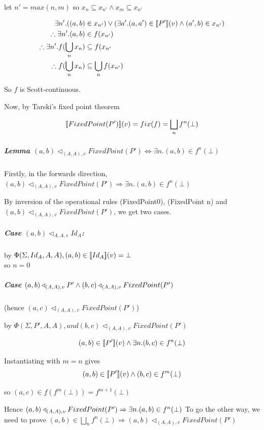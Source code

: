 \documentclass[12pt,a4paper,twoside,openright]{report}
\newcommand{\db}[1]{{\bf [\![}#1{\bf ]\!]}}
\newcommand{\deno}[1]{\db{#1}(v)}
\newcommand{\denoRule}[2]{#1 \in \deno{#2}}
\newcommand{\opRule}[3]{#1 \triangleleft_{#2, v} #3}
\newcommand{\phiRule}[3]{\Phi(\Sigma, #1, #2, #3)}
\let\oldsubparagraph\subparagraph
\renewcommand{\subparagraph}[1]{\oldsubparagraph{#1}\mbox{}}
\begin{document}
let $n' = max(n, m)$ so $x_n \subseteq x_{n'}  \wedge x_m \subseteq x_{n'}$

\begin{equation}
\begin{split}
\exists n'. ((a,b) & \in x_{n'} ) \vee (\exists a'. \denoRule{(a, a')}{P'} \wedge (a', b) \in x_{n'})\\
\therefore\exists n'. (a, b) &\in f(x_{n'})\\
\therefore\exists n'. f(\bigcup_nx_n) &\subseteq f(x_{n'}\\
\therefore f(\bigcup_nx_n) &\subseteq \bigcup_nf(x_{n'})\\
\end{split}
\end{equation}


\setlength{\leftskip}{0pt}
So $f$ is Scott-continuous.

Now, by Tarski's fixed point theorem

$$\deno{FixedPoint(P')} = fix(f) = \bigsqcup_nf^n(\bot)$$


\subparagraph{Lemma $\opRule{(a, b)}{(A, A)}{FixedPoint(P')} \Leftrightarrow \exists n. (a, b) \in f^n(\bot)$}

Firstly, in the forwards direction, $\opRule{(a, b)}{(A, A)}{FixedPoint(P')} \Rightarrow \exists n. (a, b) \in f^n(\bot)$

By inversion of the operational rules (FixedPoint0), (FixedPoint n) and $\opRule{(a, b)}{(A, A)}{FixedPoint(P')}$, we get two cases.



\subparagraph{Case $\opRule{(a,b)}{A, A}{Id_A}$:\\}
by $\phiRule{Id_A}{A}{A}, \denoRule{(a, b)}{Id_A} = \bot$\\so $n = 0$


\subparagraph{Case $\opRule{(a, b)}{(A,A)}{P'} \wedge \opRule{(b, c)}{(A,A)}{FixedPoint(P')}\\ $}
(hence $\opRule{(a, c)}{(A, A)}{FixedPoint(P')}$)

by $\phiRule{P'}{A}{A}, and \opRule{(b,c)}{(A,A)}{FixedPoint(P')}$

$$\denoRule{(a, b)}{P'} \wedge \exists n. (b, c) \in f^n(\bot)$$

Instantiating with $m = n$ gives
$$\denoRule{(a, b)}{P'} \wedge (b, c) \in f^m(\bot)$$

so $(a,c) \in f(f^m(\bot)) = f^{m+1}(\bot)$

Hence $\opRule{(a, b)}{(A, A)}{FixedPoint(P')} \Rightarrow \exists n. (a, b) \in f^n(\bot)\\\\ $
To go the other way, we need to prove $(a, b) \in \bigsqcup_nf^n(\bot) \Rightarrow \opRule{(a, b)}{(A, A)}{FixedPoint(P')}$
\end{document}
